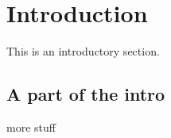 \section{Introduction}

This is an introductory section.

\subsection{A part of the intro}

more stuff

